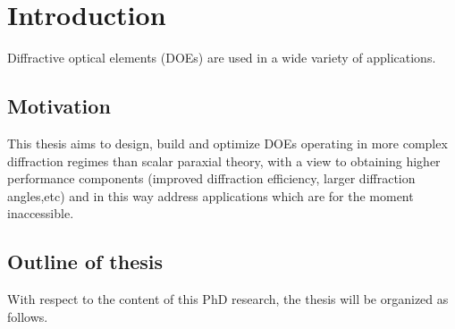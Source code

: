 \cleardoublepage
\chapter*{Introduction}
Diffractive optical elements (DOEs) are used in a wide variety of applications.
\section*{Motivation}
This thesis aims to design, build and optimize DOEs operating in more complex diffraction regimes than scalar paraxial theory, with a view to obtaining higher performance components (improved diffraction efficiency, larger diffraction angles,etc) and in this way address applications which are for the moment inaccessible.
\section*{Outline of thesis}
With respect to the content of this PhD research, the thesis will be organized as follows.
